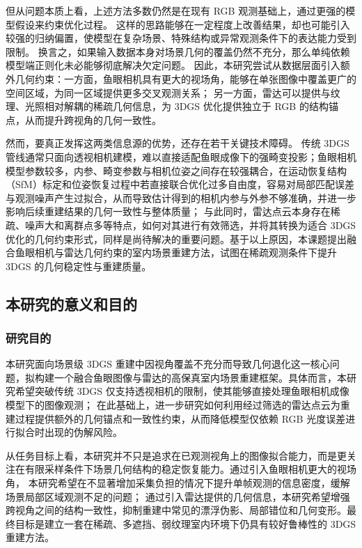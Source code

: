 但从问题本质上看，上述方法多数仍然是在现有 RGB 观测基础上，通过更强的模型假设来约束优化过程。
这样的思路能够在一定程度上改善结果，却也可能引入较强的归纳偏置，使模型在复杂场景、特殊结构或异常观测条件下的表达能力受到限制。
换言之，如果输入数据本身对场景几何的覆盖仍然不充分，那么单纯依赖模型端正则化未必能够彻底解决欠定问题。
因此，本研究尝试从数据层面引入额外几何约束：一方面，鱼眼相机具有更大的视场角，能够在单张图像中覆盖更广的空间区域，为同一区域提供更多交叉观测关系；
另一方面，雷达可以提供与纹理、光照相对解耦的稀疏几何信息，为 3DGS 优化提供独立于 RGB 的结构锚点，从而提升跨视角的几何一致性。

然而，要真正发挥这两类信息源的优势，还存在若干关键技术障碍。
传统 3DGS 管线通常只面向透视相机建模，难以直接适配鱼眼成像下的强畸变投影；鱼眼相机模型参数较多，内参、畸变参数与相机位姿之间存在较强耦合，在运动恢复结构（SfM）标定和位姿恢复过程中若直接联合优化过多自由度，容易对局部匹配误差与观测噪声产生过拟合，从而导致估计得到的相机内参与外参不够准确，并进一步影响后续重建结果的几何一致性与整体质量；
与此同时，雷达点云本身存在稀疏、噪声大和离群点多等特点，如何对其进行有效筛选，并将其转换为适合 3DGS 优化的几何约束形式，同样是尚待解决的重要问题。基于以上原因，本课题提出融合鱼眼相机与雷达几何约束的室内场景重建方法，试图在稀疏观测条件下提升 3DGS 的几何稳定性与重建质量。

\subsection{本研究的意义和目的}

\subsubsection{研究目的}

本研究面向场景级 3DGS 重建中因视角覆盖不充分而导致几何退化这一核心问题，拟构建一个融合鱼眼图像与雷达的高保真室内场景重建框架。具体而言，本研究希望突破传统 3DGS 仅支持透视相机的限制，使其能够直接处理鱼眼相机成像模型下的图像观测；
在此基础上，进一步研究如何利用经过筛选的雷达点云为重建过程提供额外的几何锚点和一致性约束，从而降低模型仅依赖 RGB 光度误差进行拟合时出现的伪解风险。

从任务目标上看，本研究并不只是追求在已观测视角上的图像拟合能力，而是更关注在有限采样条件下场景几何结构的稳定恢复能力。通过引入鱼眼相机更大的视场角，
本研究希望在不显著增加采集负担的情况下提升单帧观测的信息密度，缓解场景局部区域观测不足的问题；
通过引入雷达提供的几何信息，本研究希望增强跨视角之间的结构一致性，抑制重建中常见的漂浮伪影、局部错位和几何变形。最终目标是建立一套在稀疏、多遮挡、弱纹理室内环境下仍具有较好鲁棒性的 3DGS 重建方法。

